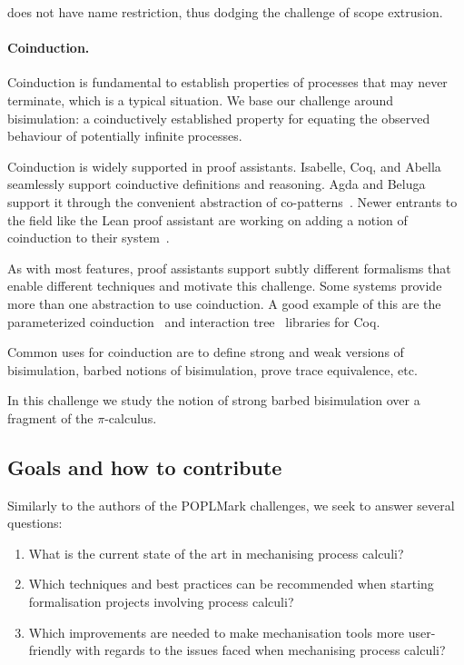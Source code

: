 \documentclass[runningheads]{llncs}
\begin{document}
\cite{Maksimovic2015} does not have name restriction, thus dodging the challenge of scope extrusion.

\paragraph{Coinduction.} 
Coinduction is fundamental to establish properties of processes that
may never terminate, which is a typical situation. We base our challenge around
bisimulation: a coinductively established property for equating the
observed behaviour of potentially infinite processes.

Coinduction is widely supported in proof assistants.
Isabelle, Coq, and Abella seamlessly support coinductive definitions and reasoning.
Agda and Beluga support it through the convenient abstraction of co-patterns~\cite{Abel2013}.
Newer entrants to the field like the Lean proof assistant are working on adding a notion of coinduction to their system~\cite{Avigad2019,Keizer2023}.

As with most features, proof assistants support subtly different formalisms that enable different techniques and motivate this challenge.
Some systems provide more than one abstraction to use coinduction.
A good example of this are the parameterized coinduction~\cite{Hur2013} and interaction tree~\cite{Xia2019} libraries for Coq.

Common uses for coinduction are to define strong and weak versions of
bisimulation, barbed notions of bisimulation, prove trace equivalence,
etc.

In this challenge we study the notion of strong barbed bisimulation
over a fragment of the $\pi$-calculus.


\subsection{Goals and how to contribute}
Similarly to the authors of the POPLMark challenges, we seek to
answer several questions:
\begin{enumerate}[label=\textbf{(Q\arabic*)},leftmargin=10mm]
\item\label{item:rq1} What is the current state of the art in mechanising process calculi?
\item\label{item:rq2} Which techniques and best practices can be recommended when starting formalisation projects involving process calculi?
\item\label{item:rq3} Which improvements are needed to make mechanisation tools more user-friendly with regards to the issues faced when mechanising process calculi?
\end{enumerate}
\end{document}
